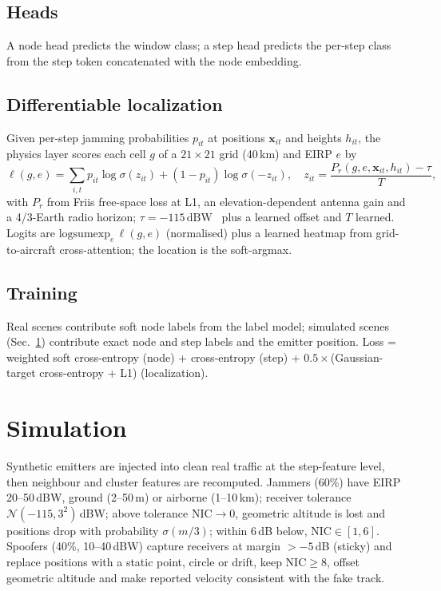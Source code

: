 \documentclass[conference]{IEEEtran}
\begin{document}
\subsection{Heads}
A node head predicts the window class; a step head predicts the per-step class from the step token
concatenated with the node embedding.
\subsection{Differentiable localization}
Given per-step jamming probabilities $p_{it}$ at positions $\mathbf{x}_{it}$ and heights $h_{it}$, the
physics layer scores each cell $g$ of a $21\times21$ grid (40\,km) and EIRP $e$ by
\begin{equation}
\ell(g,e)=\sum_{i,t} p_{it}\log\sigma(z_{it})+(1-p_{it})\log\sigma(-z_{it}),\quad
z_{it}=\frac{P_r(g,e,\mathbf{x}_{it},h_{it})-\tau}{T},
\end{equation}
with $P_r$ from Friis free-space loss at L1, an elevation-dependent antenna gain and a 4/3-Earth radio
horizon; $\tau=-115\,\mathrm{dBW}$~\cite{liu2022itm} plus a learned offset and $T$ learned. Logits are
$\mathrm{logsumexp}_e\,\ell(g,e)$ (normalised) plus a learned heatmap from grid-to-aircraft
cross-attention; the location is the soft-argmax.
\subsection{Training}
Real scenes contribute soft node labels from the label model; simulated scenes (Sec.~\ref{sec:sim})
contribute exact node and step labels and the emitter position. Loss = weighted soft cross-entropy (node)
+ cross-entropy (step) + $0.5\times$(Gaussian-target cross-entropy + L1) (localization).

\section{Simulation}\label{sec:sim}
Synthetic emitters are injected into clean real traffic at the step-feature level, then neighbour and
cluster features are recomputed. Jammers (60\%) have EIRP 20--50\,dBW, ground (2--50\,m) or airborne
(1--10\,km); receiver tolerance $\mathcal{N}(-115, 3^2)$\,dBW; above tolerance NIC$\to$0, geometric
altitude is lost and positions drop with probability $\sigma(m/3)$; within 6\,dB below, NIC$\in[1,6]$.
Spoofers (40\%, 10--40\,dBW) capture receivers at margin $>-5$\,dB (sticky) and replace positions with a
static point, circle or drift, keep NIC$\ge8$, offset geometric altitude and make reported velocity
consistent with the fake track. \simsentence
\end{document}
